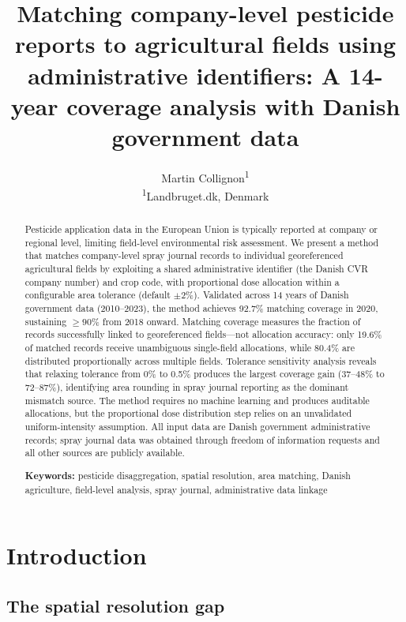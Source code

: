 \documentclass[12pt,a4paper]{article}
\title{\textbf{Matching company-level pesticide reports to agricultural fields using administrative identifiers: A 14-year coverage analysis with Danish government data}}
\author{Martin Collignon\textsuperscript{1}\\[6pt]
\textsuperscript{1}Landbruget.dk, Denmark}
\date{}
\begin{document}
\maketitle
\thispagestyle{fancy}

\begin{abstract}
Pesticide application data in the European Union is typically reported at company or regional level, limiting field-level environmental risk assessment. We present a method that matches company-level spray journal records to individual georeferenced agricultural fields by exploiting a shared administrative identifier (the Danish CVR company number) and crop code, with proportional dose allocation within a configurable area tolerance (default $\pm2\%$). Validated across 14 years of Danish government data (2010--2023), the method achieves 92.7\% matching coverage in 2020, sustaining $\geq90\%$ from 2018 onward. Matching coverage measures the fraction of records successfully linked to georeferenced fields---not allocation accuracy: only 19.6\% of matched records receive unambiguous single-field allocations, while 80.4\% are distributed proportionally across multiple fields. Tolerance sensitivity analysis reveals that relaxing tolerance from 0\% to 0.5\% produces the largest coverage gain (37--48\% to 72--87\%), identifying area rounding in spray journal reporting as the dominant mismatch source. The method requires no machine learning and produces auditable allocations, but the proportional dose distribution step relies on an unvalidated uniform-intensity assumption. All input data are Danish government administrative records; spray journal data was obtained through freedom of information requests and all other sources are publicly available.

\medskip
\noindent\textbf{Keywords:} pesticide disaggregation, spatial resolution, area matching, Danish agriculture, field-level analysis, spray journal, administrative data linkage
\end{abstract}

\clearpage

\section{Introduction}

\subsection{The spatial resolution gap}
\end{document}
